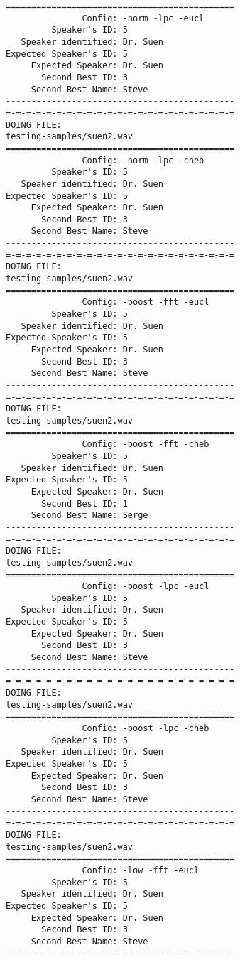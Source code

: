 \begin{verbatim}
=============================================
               Config: -norm -lpc -eucl
         Speaker's ID: 5
   Speaker identified: Dr. Suen
Expected Speaker's ID: 5
     Expected Speaker: Dr. Suen
       Second Best ID: 3
     Second Best Name: Steve
---------------------------------------------
=-=-=-=-=-=-=-=-=-=-=-=-=-=-=-=-=-=-=-=-=-=-=
DOING FILE:
testing-samples/suen2.wav
=============================================
               Config: -norm -lpc -cheb
         Speaker's ID: 5
   Speaker identified: Dr. Suen
Expected Speaker's ID: 5
     Expected Speaker: Dr. Suen
       Second Best ID: 3
     Second Best Name: Steve
---------------------------------------------
=-=-=-=-=-=-=-=-=-=-=-=-=-=-=-=-=-=-=-=-=-=-=
DOING FILE:
testing-samples/suen2.wav
=============================================
               Config: -boost -fft -eucl
         Speaker's ID: 5
   Speaker identified: Dr. Suen
Expected Speaker's ID: 5
     Expected Speaker: Dr. Suen
       Second Best ID: 3
     Second Best Name: Steve
---------------------------------------------
=-=-=-=-=-=-=-=-=-=-=-=-=-=-=-=-=-=-=-=-=-=-=
DOING FILE:
testing-samples/suen2.wav
=============================================
               Config: -boost -fft -cheb
         Speaker's ID: 5
   Speaker identified: Dr. Suen
Expected Speaker's ID: 5
     Expected Speaker: Dr. Suen
       Second Best ID: 1
     Second Best Name: Serge
---------------------------------------------
=-=-=-=-=-=-=-=-=-=-=-=-=-=-=-=-=-=-=-=-=-=-=
DOING FILE:
testing-samples/suen2.wav
=============================================
               Config: -boost -lpc -eucl
         Speaker's ID: 5
   Speaker identified: Dr. Suen
Expected Speaker's ID: 5
     Expected Speaker: Dr. Suen
       Second Best ID: 3
     Second Best Name: Steve
---------------------------------------------
=-=-=-=-=-=-=-=-=-=-=-=-=-=-=-=-=-=-=-=-=-=-=
DOING FILE:
testing-samples/suen2.wav
=============================================
               Config: -boost -lpc -cheb
         Speaker's ID: 5
   Speaker identified: Dr. Suen
Expected Speaker's ID: 5
     Expected Speaker: Dr. Suen
       Second Best ID: 3
     Second Best Name: Steve
---------------------------------------------
=-=-=-=-=-=-=-=-=-=-=-=-=-=-=-=-=-=-=-=-=-=-=
DOING FILE:
testing-samples/suen2.wav
=============================================
               Config: -low -fft -eucl
         Speaker's ID: 5
   Speaker identified: Dr. Suen
Expected Speaker's ID: 5
     Expected Speaker: Dr. Suen
       Second Best ID: 3
     Second Best Name: Steve
---------------------------------------------

\end{verbatim}
